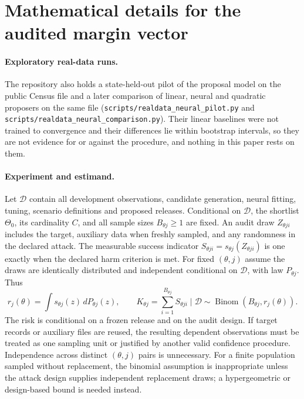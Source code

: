\section{Mathematical details for the audited margin vector}\label{app:neural}

\paragraph{Exploratory real-data runs.} The repository also holds a
state-held-out pilot of the proposal model on the public Census file and a later
comparison of linear, neural and quadratic proposers on the same file
(\texttt{scripts/realdata\_neural\_pilot.py} and
\texttt{scripts/realdata\_neural\_comparison.py}). Their linear baselines were
not trained to convergence and their differences lie within bootstrap intervals,
so they are not evidence for or against the procedure, and nothing in this paper
rests on them.

\paragraph{Experiment and estimand.}
Let $\mathcal D$ contain all development observations, candidate generation,
neural fitting, tuning, scenario definitions and proposed releases. Conditional
on $\mathcal D$, the shortlist $\Theta_0$, its cardinality $C$, and all
sample sizes $B_{\theta j}\geq1$ are fixed. An audit draw $Z_{\theta ji}$
includes the target, auxiliary data when freshly sampled, and any randomness
in the declared attack. The measurable success indicator
$S_{\theta ji}=s_{\theta j}(Z_{\theta ji})$ is one exactly when the declared
harm criterion is met. For fixed $(\theta,j)$ assume the draws are identically
distributed and independent conditional on $\mathcal D$, with law
$P_{\theta j}$. Thus
\begin{equation}
 r_j(\theta)=\int s_{\theta j}(z)\,dP_{\theta j}(z),\qquad
 K_{\theta j}=\sum_{i=1}^{B_{\theta j}}S_{\theta ji}\mid\mathcal D
 \sim\operatorname{Binom}(B_{\theta j},r_j(\theta)).
 \label{eq:neural-experiment}
\end{equation}
The risk is conditional on a frozen release and on the audit design. If target
records or auxiliary files are reused, the resulting dependent observations
must be treated as one sampling unit or justified by another valid confidence
procedure. Independence across distinct $(\theta,j)$ pairs is unnecessary.
For a finite population sampled without replacement, the binomial assumption
is inappropriate unless the attack design supplies independent replacement
draws; a hypergeometric or design-based bound is needed instead.

